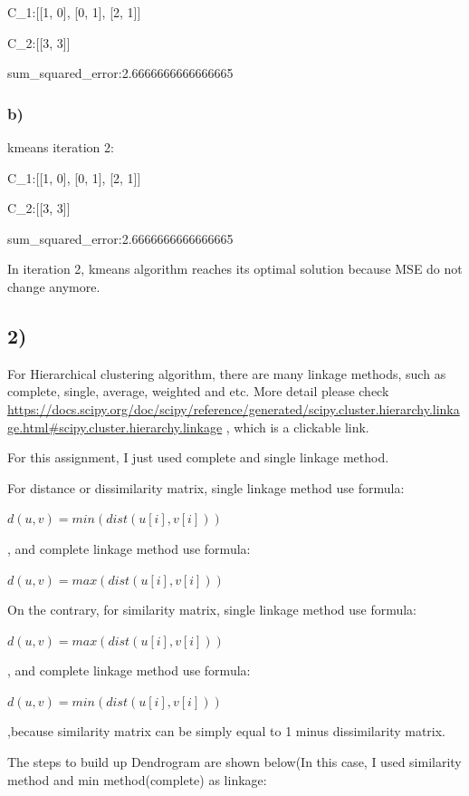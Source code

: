 \documentclass{article}
\begin{document}
C\_1:[[1, 0], [0, 1], [2, 1]]

C\_2:[[3, 3]]

sum\_squared\_error:2.6666666666666665

\subsubsection{b)}

kmeans iteration 2:

C\_1:[[1, 0], [0, 1], [2, 1]]

C\_2:[[3, 3]]

sum\_squared\_error:2.6666666666666665

In iteration 2, kmeans algorithm reaches its optimal solution because MSE do not change anymore.

\subsection{2)}

For Hierarchical clustering algorithm, there are many linkage methods, such as complete, single, average, weighted and etc. More detail please check \href{https://docs.scipy.org/doc/scipy/reference/generated/scipy.cluster.hierarchy.linkage.html#scipy.cluster.hierarchy.linkage}{\url{https://docs.scipy.org/doc/scipy/reference/generated/scipy.cluster.hierarchy.linkage.html#scipy.cluster.hierarchy.linkage}} , which is a clickable link.

For this assignment, I just used complete and single linkage method.

For distance or dissimilarity matrix, single linkage method use formula:

$d(u,v) = min(dist(u[i],v[i]))$

, and complete linkage method use formula:

$d(u,v) = max(dist(u[i],v[i]))$

On the contrary, for similarity matrix, single linkage method use formula:

$d(u,v) = max(dist(u[i],v[i]))$

, and complete linkage method use formula:

$d(u,v) = min(dist(u[i],v[i]))$

,because similarity matrix can be simply equal to 1 minus dissimilarity matrix.

The steps to build up Dendrogram are shown below(In this case, I used similarity method and min method(complete) as linkage:
\end{document}
